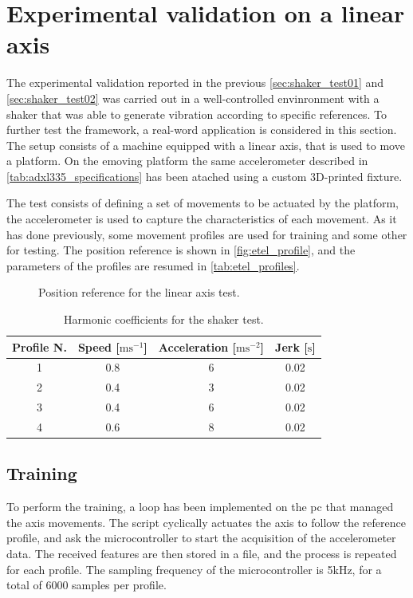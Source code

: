 \clearpage
\section{Experimental validation on a linear axis}
\label{sec:ExperimentalValidation}

The experimental validation reported in the previous \autoref{sec:shaker_test01} and \autoref{sec:shaker_test02} was carried out in a well-controlled envinronment with a shaker that was able to generate vibration according to specific references. To further test the framework, a real-word application is considered in this section. The setup consists of a machine equipped with a linear axis, that is used to move a platform. On the emoving platform the same accelerometer described in \autoref{tab:adxl335_specifications} has been atached using a custom 3D-printed fixture.

The test consists of defining a set of movements to be actuated by the platform, the accelerometer is used to capture the characteristics of each movement. As it has done previously, some movement profiles are used for training and some other for testing. The position reference is shown in \autoref{fig:etel_profile}, and the parameters of the profiles are resumed in \autoref{tab:etel_profiles}.

\begin{figure}
    \centering
    \todo%
    \caption{Position reference for the linear axis test.}
    \label{fig:etel_profile}
\end{figure}

\begin{table}
    \centering
    \caption{Harmonic coefficients for the shaker test.}
    \label{tab:etel_profiles}
    \begin{tabular}{cccc} 
    \toprule
    \textbf{Profile N.} & \textbf{Speed} {[}$\text{m}\text{s}^{-1}$] & \textbf{Acceleration} {[}$\text{m}\text{s}^{-2}$] & \textbf{Jerk} {[}$\text{s}$] \\ 
    \hline
    1 & 0.8 & 6 & 0.02 \\
    2 & 0.4 & 3 & 0.02 \\
    3 & 0.4 & 6 & 0.02 \\
    4 & 0.6 & 8 & 0.02 \\
    \bottomrule
\end{tabular}
\end{table}

\subsection{Training}
To perform the training, a loop has been implemented on the \gls{pc} that managed the axis movements. The script cyclically actuates the axis to follow the reference profile, and ask the microcontroller to start the acquisition of the accelerometer data. The received features are then stored in a file, and the process is repeated for each profile. The sampling frequency of the microcontroller is 5kHz, for a total of 6000 samples per profile. 

